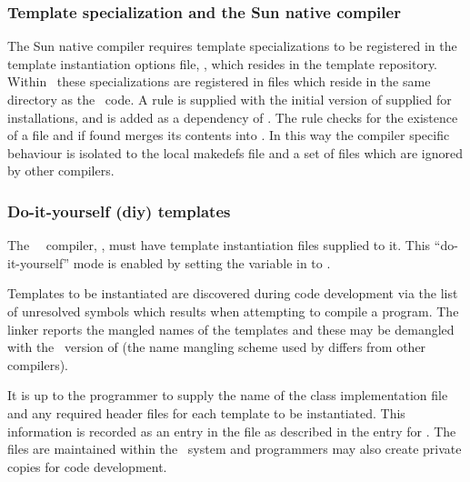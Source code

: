 \subsubsection*{Template specialization and the Sun native compiler}

The Sun native compiler requires template specializations to be registered in
the template instantiation options file, , which resides in
the template repository.  Within \aipspp\ these specializations are registered
in  files which reside in the same directory as the
\cplusplus\ code.  A  rule is supplied with the initial
version of  supplied for  installations, and
 is added as a dependency of .  The
 rule checks for the existence of a 
file and if found merges its contents into .  In this way
the compiler specific behaviour is isolated to the local makedefs file and a
set of  files which are ignored by other compilers.

\subsubsection*{Do-it-yourself (diy) templates}

The \gnu\ \cplusplus\ compiler, , must have template
instantiation files supplied to it.  This ``do-it-yourself'' mode is enabled
by setting the  variable in  to .

Templates to be instantiated are discovered during code development via the
list of unresolved symbols which results when attempting to compile a program.
The linker reports the mangled names of the templates and these may be
demangled with the \gnu\ version of  (the name mangling
scheme used by  differs from other compilers).

It is up to the programmer to supply the name of the class implementation file
and any required header files for each template to be instantiated.  This
information is recorded as an entry in the  file as
described in the entry for .  The  files are
maintained within the \aipspp\ system and programmers may also create private
copies for code development.


